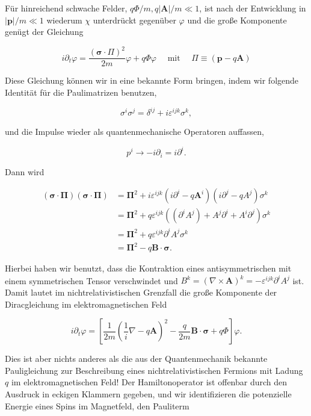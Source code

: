 \documentclass[10pt, letterpaper]{article}
\begin{document}
Für hinreichend schwache Felder, $q \Phi / m, q|\mathbf{A}| / m \ll 1$, ist nach der Entwicklung in $|\mathbf{p}| / m \ll 1$ wiederum $\chi$ unterdrückt gegenüber $\varphi$ und die große Komponente genügt der Gleichung

$$
i \partial_{t} \varphi=\frac{(\boldsymbol{\sigma} \cdot \Pi)^{2}}{2 m} \varphi+q \Phi \varphi \quad \text { mit } \quad \Pi \equiv(\mathbf{p}-q \mathbf{A})
$$

Diese Gleichung können wir in eine bekannte Form bringen, indem wir folgende Identität für die Paulimatrizen benutzen,

$$
\sigma^{i} \sigma^{j}=\delta^{i j}+i \varepsilon^{i j k} \sigma^{k},
$$

und die Impulse wieder als quantenmechanische Operatoren auffassen,

$$
p^{i} \rightarrow-i \partial_{i}=i \partial^{i} .
$$

Dann wird

$$
\begin{aligned}
(\boldsymbol{\sigma} \cdot \boldsymbol{\Pi})(\boldsymbol{\sigma} \cdot \boldsymbol{\Pi}) & =\boldsymbol{\Pi}^{2}+i \varepsilon^{i j k}\left(i \partial^{i}-q \mathbf{A}^{i}\right)\left(i \partial^{j}-q A^{j}\right) \sigma^{k} \\
& =\boldsymbol{\Pi}^{2}+q \varepsilon^{i j k}\left(\left(\partial^{i} A^{j}\right)+A^{j} \partial^{i}+A^{i} \partial^{j}\right) \sigma^{k} \\
& =\boldsymbol{\Pi}^{2}+q \varepsilon^{i j k} \partial^{i} A^{j} \sigma^{k} \\
& =\boldsymbol{\Pi}^{2}-q \mathbf{B} \cdot \boldsymbol{\sigma} .
\end{aligned}
$$

Hierbei haben wir benutzt, dass die Kontraktion eines antisymmetrischen mit einem symmetrischen Tensor verschwindet und $B^{k}=(\nabla \times \mathbf{A})^{k}=-\varepsilon^{i j k} \partial^{i} A^{j}$ ist. Damit lautet im nichtrelativistischen Grenzfall die große Komponente der Diracgleichung im elektromagnetischen Feld

$$
i \partial_{t} \varphi=\left[\frac{1}{2 m}\left(\frac{1}{i} \nabla-q \mathbf{A}\right)^{2}-\frac{q}{2 m} \mathbf{B} \cdot \boldsymbol{\sigma}+q \Phi\right] \varphi .
$$

Dies ist aber nichts anderes als die aus der Quantenmechanik bekannte Pauligleichung zur Beschreibung eines nichtrelativistischen Fermions mit Ladung $q$ im elektromagnetischen Feld! Der Hamiltonoperator ist offenbar durch den Ausdruck in eckigen Klammern gegeben, und wir identifizieren die potenzielle Energie eines Spins im Magnetfeld, den Pauliterm
\end{document}
